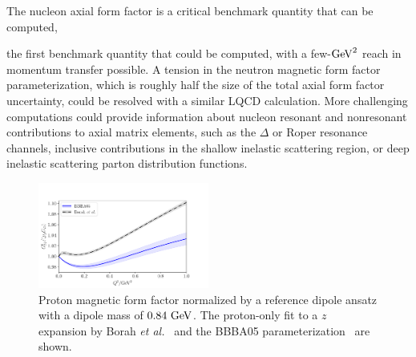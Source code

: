 The nucleon axial form factor is a critical benchmark quantity that can be computed,

the first benchmark quantity that could be computed, with a few-${\rm GeV}^2$ reach in momentum transfer possible.
A tension in the neutron magnetic form factor parameterization,
 which is roughly half the size of the total axial form factor uncertainty,
 could be resolved with a similar LQCD calculation.
More challenging computations could provide information about nucleon
 resonant and nonresonant contributions to axial matrix elements,
 such as the $\Delta$ or Roper resonance channels,
 inclusive contributions in the shallow inelastic scattering region,
 or deep inelastic scattering parton distribution functions.

\begin{figure}[hbt!]
 \centering
 \includegraphics[width=0.5\textwidth]{plots/proton_magnetic-standalone.pdf}
\caption{
 Proton magnetic form factor normalized by a reference dipole ansatz
 with a dipole mass of $0.84~{\rm GeV}$.
 The proton-only fit to a $z$ expansion by Borah {\it et al.}~\cite{Borah:2020gte}
 and the BBBA05 parameterization~\cite{Bradford:2006yz} are shown.
 \label{fig:protonmagneticff}
}
\end{figure}

